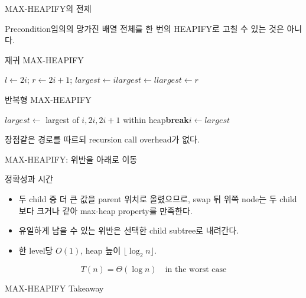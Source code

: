 \begin{frame}{MAX-HEAPIFY의 전제}
\begin{alertblock}{Precondition}임의의 망가진 배열 전체를 한 번의 HEAPIFY로 고칠 수 있는 것은 아니다.\end{alertblock}
\end{frame}
\begin{frame}{재귀 MAX-HEAPIFY}
\small\begin{algorithmic}[1]\State $l\gets2i$; $r\gets2i+1$; $largest\gets i$\State $largest\gets l$\EndIf{}\State $largest\gets r$\EndIf{}\State {}\State {}\EndIf\EndProcedure\end{algorithmic}
\end{frame}
\begin{frame}{반복형 MAX-HEAPIFY}
\begin{algorithmic}[1]\State $largest\gets$ largest of $i,2i,2i+1$ within heap\State \textbf{break}\EndIf\State {}\State $i\gets largest$\EndWhile\end{algorithmic}
\begin{block}{장점}같은 경로를 따르되 recursion call overhead가 없다.\end{block}
\end{frame}
\begin{frame}{MAX-HEAPIFY: 위반을 아래로 이동}
\centering{}
\vspace{-1mm}
\end{frame}
\begin{frame}{정확성과 시간}
\begin{itemize}\item 두 child 중 더 큰 값을 parent 위치로 올렸으므로, swap 뒤 위쪽 node는 두 child보다 크거나 같아 max-heap property를 만족한다.\item 유일하게 남을 수 있는 위반은 선택한 child subtree로 내려간다.\item 한 level당 $O(1)$, heap 높이 $\lfloor\log_2 n\rfloor$.\end{itemize}
\[T(n)=\Theta(\log n)\quad\text{in the worst case}\]
\end{frame}
\begin{frame}{MAX-HEAPIFY Takeaway}
\end{frame}
